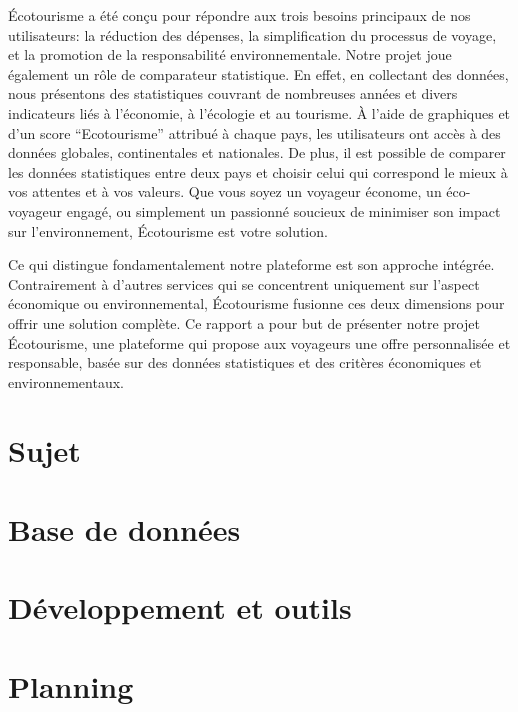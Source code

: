 \documentclass[mstat,12pt]{unswthesis}
\begin{document}
\begin{adjustwidth}{-2cm}{}
\par

Écotourisme a été conçu pour répondre aux trois besoins principaux de
nos utilisateurs: la réduction des dépenses, la simplification du
processus de voyage, et la promotion de la responsabilité
environnementale. Notre projet joue également un rôle de comparateur
statistique. En effet, en collectant des données, nous présentons des
statistiques couvrant de nombreuses années et divers indicateurs liés à
l'économie, à l'écologie et au tourisme. À l'aide de graphiques et d'un
score ``Ecotourisme'' attribué à chaque pays, les utilisateurs ont accès
à des données globales, continentales et nationales. De plus, il est
possible de comparer les données statistiques entre deux pays et choisir
celui qui correspond le mieux à vos attentes et à vos valeurs. Que vous
soyez un voyageur économe, un éco-voyageur engagé, ou simplement un
passionné soucieux de minimiser son impact sur l'environnement,
Écotourisme est votre solution.

\par

Ce qui distingue fondamentalement notre plateforme est son approche
intégrée. Contrairement à d'autres services qui se concentrent
uniquement sur l'aspect économique ou environnemental, Écotourisme
fusionne ces deux dimensions pour offrir une solution complète. Ce
rapport a pour but de présenter notre projet Écotourisme, une plateforme
qui propose aux voyageurs une offre personnalisée et responsable, basée
sur des données statistiques et des critères économiques et
environnementaux.

\hypertarget{sujet}{%
\chapter{Sujet}\label{sujet}}

\hypertarget{base-de-donnuxe9es}{%
\chapter{Base de données}\label{base-de-donnuxe9es}}

\hypertarget{duxe9veloppement-et-outils}{%
\chapter{Développement et outils}\label{duxe9veloppement-et-outils}}

\hypertarget{planning}{%
\chapter{Planning}\label{planning}}


\end{adjustwidth}
\end{document}
